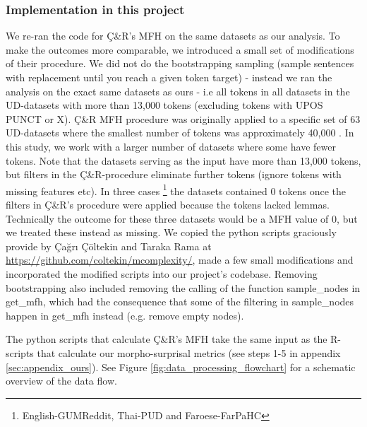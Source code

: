 \documentclass[USenglish]{article}
\begin{document}
\subsubsection{Implementation in this project}
We re-ran the code for Ç\&R's MFH on the same datasets as our analysis. 
To make the outcomes more comparable, we introduced a small set of modifications of their procedure. 
We did not do the bootstrapping sampling (sample sentences with replacement until you reach a given token target) - instead we ran the analysis on the exact same datasets as ours - i.e all tokens in all datasets in the UD-datasets with more than 13,000 tokens (excluding tokens with UPOS PUNCT or X). 
Ç\&R MFH procedure was originally applied to a specific set of 63 UD-datasets where the smallest number of tokens was approximately 40,000 \citet[32]{ccoltekin2023complexity}. 
In this study, we work with a larger number of datasets where some have fewer tokens.
Note that the datasets serving as the input have more than 13,000 tokens, but filters in the Ç\&R-procedure eliminate further tokens (ignore tokens with missing features etc).
In three cases \footnote{English-GUMReddit, Thai-PUD and Faroese-FarPaHC} the datasets contained 0 tokens once the filters in Ç\&R's procedure were applied because the tokens lacked lemmas. 
Technically the outcome for these three datasets would be a MFH value of 0, but we treated these instead as missing.
We copied the python scripts graciously provide by Çağrı Çöltekin and Taraka Rama at \url{https://github.com/coltekin/mcomplexity/}, made a few small modifications and incorporated the modified scripts into our project's codebase. 
Removing bootstrapping also included removing the calling of the function sample\_nodes in get\_mfh, which had the consequence that some of the filtering in sample\_nodes happen in get\_mfh instead (e.g. remove empty nodes).

The python scripts that calculate Ç\&R's MFH take the same input as the R-scripts that calculate our morpho-surprisal metrics (see steps 1-5 in appendix \ref{sec:appendix_ours}). 
See Figure \ref{fig:data_processing_flowchart} for a schematic overview of the data flow.
\FloatBarrier
\newpage
\end{document}
